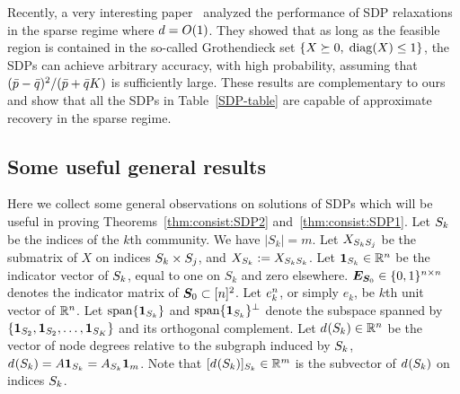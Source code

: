 Recently,  a very interesting paper~\cite{Guedon2014} analyzed the performance of SDP relaxations in the sparse regime where $d = O(1)$.   They showed that as long as the feasible region is contained in the so-called Grothendieck set $\{X \succeq 0,\; \operatorname{diag}(X) \le 1\}$, the SDPs can achieve arbitrary accuracy, with high probability, assuming that $(\bar{p} - \bar{q})^2 / (\bar{p} + \bar{q} K)$ is sufficiently large. These results are complementary to ours and show that all the SDPs in Table~\ref{SDP-table} are capable of approximate recovery in the sparse regime. 



\subsection{Some useful general results}\label{sec:aux:results}
Here we collect some general observations on solutions of SDPs which will be useful in proving Theorems~\ref{thm:consist:SDP2} and~\ref{thm:consist:SDP1}.  Let $S_{k}$ be the indices of the $k$th community. We have $|S_k| = m$. Let  $X_{S_{k}S_{j}}$ be the submatrix of $X$ on indices $S_{k} \times S_{j}$, and $X_{S_{k}}:= X_{S_{k}S_{k}}$. Let $\bm{1}_{S_{k}} \in \mathbb{R}^n$ be the indicator vector of $S_{k}$, equal to one on $S_k$ and zero elsewhere. $\bm{E}_{\bm{S}_0} \in \{0,1\}^{n \times n}$ denotes the indicator matrix of $\bm{S}_0 \subset [n]^2$. Let $e_{k}^{n}$, or simply $e_k$, be $k$th unit vector of $\mathbb{R}^n$. Let $\operatorname{span}\{\bm{1}_{S_{k}}\}$ and $\operatorname{span}\{\bm{1}_{S_{k}}\}^\perp$  denote the subspace spanned by $\{\bm{1}_{S_{2}},\bm{1}_{S_{2}}, \dots, \bm{1}_{S_{K}}\}$ and its orthogonal complement.
Let $d_{}(S_{k}) \in \mathbb{R}^n$ be the vector of node degrees relative to the subgraph induced by $S_{k}$, $d_{}(S_{k}) = A \bm{1}_{S_{k}} = A_{S_{k}} \bm{1}_m$. Note that $[d_{}(S_{k})]_{S_{k}} \in \mathbb{R}^m$ is the subvector of $d_{}(S_{k})$ on indices $S_{k}$. 
    




